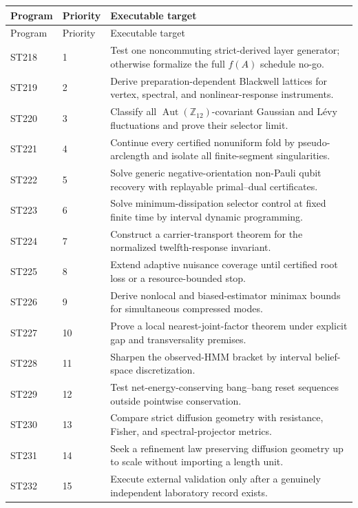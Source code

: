 \documentclass[11pt,a4paper]{article}
\begin{document}
\begin{longtable}{@{}p{}p{}p{}@{}}
\toprule Program & Priority & Executable target\\\midrule\endfirsthead
\toprule Program & Priority & Executable target\\\midrule\endhead
ST218 & 1 & Test one noncommuting strict-derived layer generator; otherwise formalize the full $f(A)$ schedule no-go.\\
ST219 & 2 & Derive preparation-dependent Blackwell lattices for vertex, spectral, and nonlinear-response instruments.\\
ST220 & 3 & Classify all $\operatorname{Aut}(\mathbb Z_{12})$-covariant Gaussian and L\'evy fluctuations and prove their selector limit.\\
ST221 & 4 & Continue every certified nonuniform fold by pseudo-arclength and isolate all finite-segment singularities.\\
ST222 & 5 & Solve generic negative-orientation non-Pauli qubit recovery with replayable primal--dual certificates.\\
ST223 & 6 & Solve minimum-dissipation selector control at fixed finite time by interval dynamic programming.\\
ST224 & 7 & Construct a carrier-transport theorem for the normalized twelfth-response invariant.\\
ST225 & 8 & Extend adaptive nuisance coverage until certified root loss or a resource-bounded stop.\\
ST226 & 9 & Derive nonlocal and biased-estimator minimax bounds for simultaneous compressed modes.\\
ST227 & 10 & Prove a local nearest-joint-factor theorem under explicit gap and transversality premises.\\
ST228 & 11 & Sharpen the observed-HMM bracket by interval belief-space discretization.\\
ST229 & 12 & Test net-energy-conserving bang--bang reset sequences outside pointwise conservation.\\
ST230 & 13 & Compare strict diffusion geometry with resistance, Fisher, and spectral-projector metrics.\\
ST231 & 14 & Seek a refinement law preserving diffusion geometry up to scale without importing a length unit.\\
ST232 & 15 & Execute external validation only after a genuinely independent laboratory record exists.\\
\bottomrule
\end{longtable}
\end{document}
